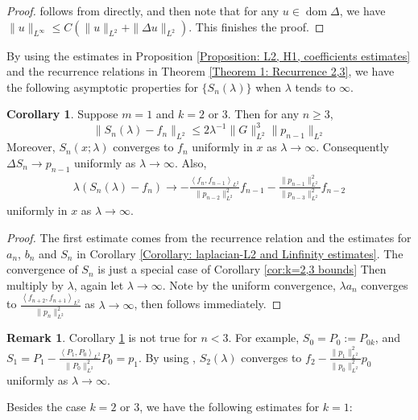\documentclass[12pt]{amsart}
\makeatletter
\renewcommand*{\eqref}[1]{%
  \hyperref[{#1}]{\textup{\tagform@{\ref*{#1}}}}%
}
\theoremstyle{plain}
\theoremstyle{definition}
\newtheorem{corollary}{Corollary}[section]
\newtheorem{remark}{Remark}[section]
\newcommand{\inner}[2]{\left \langle #1, #2\right \rangle}
\newcommand{\lap}{\Delta}
\makeatother
\begin{document}
\begin{proof}
\eqref{L2EstimateofSobolevLaplacian} follows from \eqref{SobolevH1Estimate} directly, and then note that for any $u\in \operatorname{dom}\lap$, we have $\|u\|_{L^\infty}\le C(\|u\|_{L^2}+\|\lap u\|_{L^2})$. This finishes the proof.
\end{proof}

By using the estimates in Proposition \ref{Proposition: L2, H1, coefficients estimates} and the recurrence relations in Theorem \ref{Theorem 1: Recurrence 2,3}, we have the following asymptotic properties for $\{S_n(\lambda)\}$ when $\lambda$ tends to $\infty$.

\begin{corollary}\label{Corollary: Convergence result for lambda}
  Suppose $m=1$ and $k=2$ or $3$. Then for any $n\ge3$, $$\|S_n(\lambda)-f_n\|_{L^2}\le 2\lambda^{-1}\|G\|_{L^2}^3\|p_{n-1}\|_{L^2}$$ Moreover, $S_n(x;\lambda)$ converges to $f_n$ uniformly in $x$ as $\lambda\rightarrow\infty$. Consequently $\lap S_n\rightarrow p_{n-1}$ uniformly as $\lambda\rightarrow\infty$. Also, 
\begin{align}
\lambda(S_n(\lambda)-f_n)\rightarrow-\frac{\inner{f_n}{f_{n-1}}_{L^2}}{\|p_{n-2}\|_{L^2}^2}f_{n-1}-\frac{\|p_{n-1}\|_{L^2}^2}{\|p_{n-3}\|_{L^2}^2}f_{n-2} \label{Asymptotic extimate of S_n(lambda) to fn}
\end{align}
uniformly in $x$ as $\lambda\rightarrow\infty$.
\end{corollary}

\begin{proof}
The first estimate comes from the recurrence relation \eqref{3-term recurrence} and the estimates for $a_n$, $b_n$ and $S_n$ in Corollary \ref{Corollary: laplacian-L2 and Linfinity estimates}. The convergence of $S_n$ is just a special case of Corollary \ref{cor:k=2,3 bounds} Then multiply \eqref{3-term recurrence} by $\lambda$, again let $\lambda\rightarrow\infty$. Note by the uniform convergence, $\lambda a_n$ converges to $\frac{\inner{f_{n+2}}{f_{n+1}}_{L^2}}{\|p_n\|_{L^2}^2}$ as $\lambda\rightarrow\infty$, then \eqref{Asymptotic extimate of S_n(lambda) to fn} follows immediately.
\end{proof}

\begin{remark}\label{remark: Convergence result not true for n<3}
Corollary \ref{Corollary: Convergence result for lambda} is not true for $n<3$. For example, $S_0=P_0:=P_{0k}$, and $S_1=P_1-\frac{\inner{P_1}{P_0}_{L^2}}{ \|P_0\|_{L^2}^2}P_0=p_1$. By using \eqref{3-term recurrence}, $S_2(\lambda)$ converges to $f_2-\frac{\|p_1\|_{L^2}^2}{\|p_0\|_{L^2}^2}p_0$ uniformly as $\lambda\rightarrow\infty$.
\end{remark} 
 Besides the case $k=2$ or $3$, we have the following estimates for $k=1$:
\end{document}
